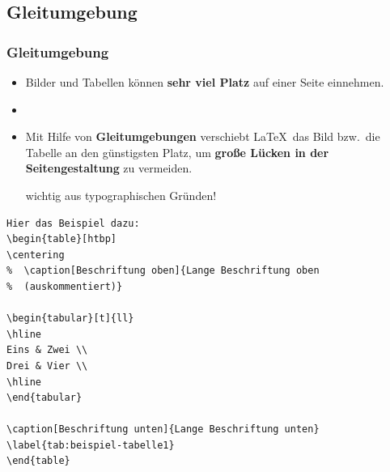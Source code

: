 \subsection{Gleitumgebung}
\label{sec:floating}

\begin{frame}[fragile]
\frametitle{Gleitumgebung}

\begin{itemize}
	
	\item Bilder und Tabellen können \textbf{sehr viel Platz} auf einer Seite einnehmen.
	
	\item[]
	
	\item Mit Hilfe von \textbf{Gleitumgebungen} verschiebt \LaTeX\ das Bild  bzw.\ die Tabelle an den günstigsten Platz, um \textbf{große Lücken in der Seitengestaltung} zu vermeiden.
	
	\ras wichtig aus typographischen Gründen!
	
\end{itemize}
\end{frame}


\begin{frame}[fragile]

{\small
\begin{lstlisting}
Hier das Beispiel dazu:
\begin{table}[htbp]
\centering
%  \caption[Beschriftung oben]{Lange Beschriftung oben 
%  (auskommentiert)}

\begin{tabular}[t]{ll}
\hline
Eins & Zwei \\
Drei & Vier \\
\hline
\end{tabular}

\caption[Beschriftung unten]{Lange Beschriftung unten}
\label{tab:beispiel-tabelle1}
\end{table}
\end{lstlisting}
}

\end{frame}


